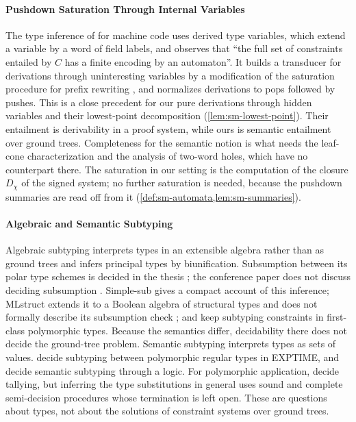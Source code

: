 \paragraph{Pushdown Saturation Through Internal Variables}
The type inference of \citet{NoonanLoginovCok16} for machine code uses derived
type variables, which extend a variable by a word of field labels, and observes
that ``the full set of constraints entailed by $C$ has a finite encoding by an
automaton''. It builds a transducer for derivations through uninteresting
variables by a modification of the saturation procedure for prefix rewriting
\citep{Buchi64,Caucal92}, and normalizes derivations to pops followed by
pushes. This is a close precedent for our pure derivations through hidden
variables and their lowest-point decomposition (\cref{lem:sm-lowest-point}).
Their entailment is derivability in a proof system, while ours is semantic
entailment over ground trees. Completeness for the semantic notion is what
needs the leaf-cone characterization and the analysis of two-word holes, which
have no counterpart there. The saturation in our setting is the computation of
the closure $D_\chi$ of the signed system; no further saturation is needed,
because the pushdown summaries are read off from it
(\cref{def:sm-automata,lem:sm-summaries}).

\paragraph{Algebraic and Semantic Subtyping}
Algebraic subtyping \citep{Dolan16,DolanMycroft17} interprets types in an
extensible algebra rather than as ground trees and infers principal types by
biunification. Subsumption between its polar type schemes is decided in the
thesis \citep{Dolan16}; the conference paper does not discuss deciding
subsumption \citep{DolanMycroft17}. Simple-sub \citep{Parreaux20} gives a compact
account of this inference; MLstruct extends it to a Boolean algebra of
structural types and does not formally describe its subsumption check
\citep{ParreauxChau22}; and \citet{ParreauxEtAl24} keep subtyping constraints
in first-class polymorphic types. Because the semantics differ, decidability
there does not decide the ground-tree problem. Semantic subtyping interprets types as sets of values.
\citet{CastagnaXu11} decide subtyping between polymorphic regular types in
EXPTIME, and \citet{GesbertGenevesLayaida15} decide semantic subtyping through
a logic. For polymorphic application, \citet{CastagnaNguyenXuAbate15} decide
tallying, but inferring the type substitutions in general uses sound and
complete semi-decision procedures whose termination is left open. These are
questions about types, not about the solutions of constraint systems over
ground trees.

